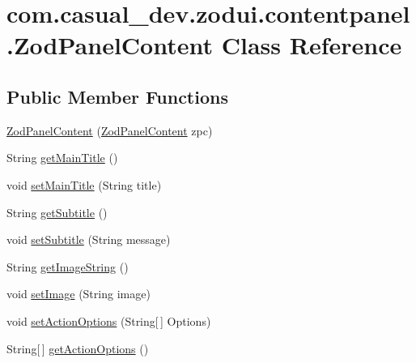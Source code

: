 \hypertarget{classcom_1_1casual__dev_1_1zodui_1_1contentpanel_1_1_zod_panel_content}{\section{com.\-casual\-\_\-dev.\-zodui.\-contentpanel.\-Zod\-Panel\-Content Class Reference}
\label{classcom_1_1casual__dev_1_1zodui_1_1contentpanel_1_1_zod_panel_content}
}
\subsection*{Public Member Functions}
\begin{DoxyCompactItemize}
\item 
\hyperlink{classcom_1_1casual__dev_1_1zodui_1_1contentpanel_1_1_zod_panel_content_a0837e69e5f4f507e42837adb4bae1620}{Zod\-Panel\-Content} (\hyperlink{classcom_1_1casual__dev_1_1zodui_1_1contentpanel_1_1_zod_panel_content}{Zod\-Panel\-Content} zpc)
\item 
String \hyperlink{classcom_1_1casual__dev_1_1zodui_1_1contentpanel_1_1_zod_panel_content_a2bee04d63b4c94f30786d2656e7231c0}{get\-Main\-Title} ()
\item 
void \hyperlink{classcom_1_1casual__dev_1_1zodui_1_1contentpanel_1_1_zod_panel_content_a7770065a8f12ab7580bdd8ec47af56d5}{set\-Main\-Title} (String title)
\item 
String \hyperlink{classcom_1_1casual__dev_1_1zodui_1_1contentpanel_1_1_zod_panel_content_a745df709cc1d76741afd288148b1d3ea}{get\-Subtitle} ()
\item 
void \hyperlink{classcom_1_1casual__dev_1_1zodui_1_1contentpanel_1_1_zod_panel_content_a32a218ff1efd88c2b80097dfba88571f}{set\-Subtitle} (String message)
\item 
String \hyperlink{classcom_1_1casual__dev_1_1zodui_1_1contentpanel_1_1_zod_panel_content_a7342f7316ad86aba938ee9ca177d5134}{get\-Image\-String} ()
\item 
void \hyperlink{classcom_1_1casual__dev_1_1zodui_1_1contentpanel_1_1_zod_panel_content_a1b4743aebb0c881ccff6eea3d632e3d4}{set\-Image} (String image)
\item 
void \hyperlink{classcom_1_1casual__dev_1_1zodui_1_1contentpanel_1_1_zod_panel_content_a56b04457fd49ece35d17d7badec44ebb}{set\-Action\-Options} (String\mbox{[}$\,$\mbox{]} Options)
\item 
String\mbox{[}$\,$\mbox{]} \hyperlink{classcom_1_1casual__dev_1_1zodui_1_1contentpanel_1_1_zod_panel_content_aeb70c5aa2355b9e184d6e7ad9ec86c36}{get\-Action\-Options} ()

\end{DoxyCompactItemize}
